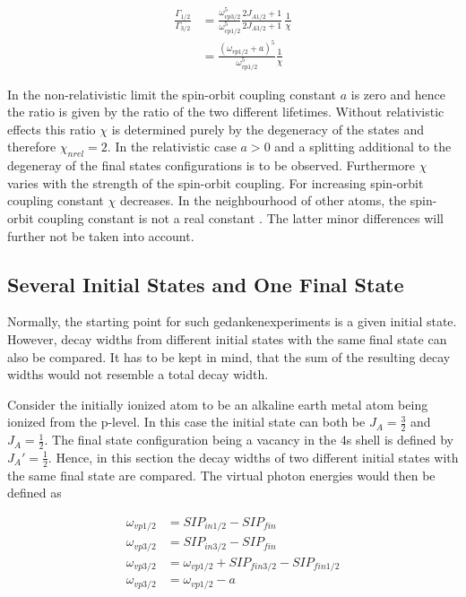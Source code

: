 \begin{align}
  \frac{\Gamma_{1/2}}{\Gamma_{3/2}}
  &= \frac{\omega_{vp3/2}^5}{\omega_{vp1/2}^5} \frac{2J_{A1/2}+1}{2J_{A3/2}+1} \,
     \frac{1}{\chi}\\
  &= \frac{(\omega_{vp1/2} +a)^5}{\omega_{vp1/2}^5} \frac{1}{\chi}
     \label{equation:gamma_ratio_arxetype}
\end{align}

In the non-relativistic limit the spin-orbit coupling constant $a$ is zero and
hence the ratio is given by the ratio of the two different lifetimes. Without
relativistic effects this ratio $\chi$ is determined purely by the degeneracy
of the states and therefore $\chi_{nrel} = 2$.
In the relativistic case $a>0$ and a splitting additional to the degeneray of
the final states configurations is to be observed. Furthermore $\chi$ varies
with the strength of the spin-orbit coupling. For increasing spin-orbit coupling
constant $\chi$ decreases.
In the neighbourhood of other atoms, the spin-orbit coupling constant is not
a real constant \cite{Freudenberg_Forsch}. The latter minor differences will further not be taken
into account.




\subsection{Several Initial States and One Final State}
Normally, the starting point for such gedankenexperiments is a given initial
state. However, decay widths from different initial states with the same
final state can also be compared. It has to be kept in mind, that
the sum of the resulting decay widths would not resemble a total decay width.

Consider the initially ionized atom to be an alkaline earth metal atom
being ionized from the
p-level. In this case the initial state can both be $J_A = \frac 32$ and
$J_A = \frac12$. The final state configuration being a vacancy in the
4s shell is defined by $J_A'= \frac 12$. Hence, in this section the decay
widths of two different initial states with the same final state are compared.
The virtual photon energies would then be defined as

\begin{align}
  \omega_{vp1/2} &= SIP_{in1/2} - SIP_{fin}  \\
  \omega_{vp3/2} &= SIP_{in3/2} - SIP_{fin}  \\
  \omega_{vp3/2} &= \omega_{vp1/2} + SIP_{fin3/2} - SIP_{fin1/2} \\
  \omega_{vp3/2} &= \omega_{vp1/2} - a 
\end{align}

